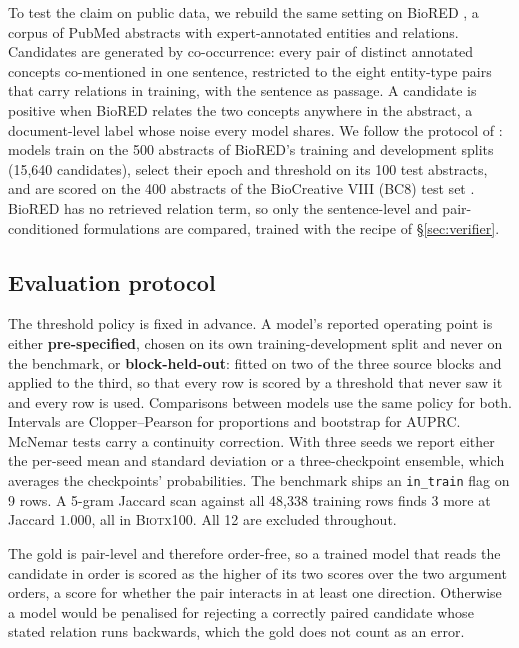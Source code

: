 \documentclass[11pt]{article}
\begin{document}
To test the claim on public data, we rebuild the same setting on BioRED \citep{luo2022biored}, a
corpus of PubMed abstracts with expert-annotated entities and relations. Candidates are generated
by co-occurrence: every pair of distinct annotated concepts co-mentioned in one sentence, restricted
to the eight entity-type pairs that carry relations in training, with the sentence as passage. A candidate is positive when BioRED relates
the two concepts anywhere in the abstract, a document-level label whose noise every model shares.
We follow the protocol of \citet{lai2025bioredirect}: models train on the 500 abstracts of BioRED's
training and development splits (15{,}640 candidates), select their epoch and threshold on its 100
test abstracts, and are scored on the 400 abstracts of the BioCreative VIII (BC8) test set
\citep{islamaj2024overview}. BioRED has no retrieved relation term, so only the sentence-level and
pair-conditioned formulations are compared, trained with the recipe of \S\ref{sec:verifier}.

\subsection{Evaluation protocol}
\label{sec:protocol}

The threshold policy is fixed in advance. A model's reported operating point is either
\textbf{pre-specified}, chosen on its own training-development split and never on the benchmark, or
\textbf{block-held-out}: fitted on two of the three source blocks and applied to the third, so that
every row is scored by a threshold that never saw it and every row is used. Comparisons between
models use the same policy for both. Intervals are Clopper--Pearson for proportions and bootstrap for AUPRC. McNemar tests
\citep{mcnemar1947note} carry a continuity correction. With three seeds we report either the
per-seed mean and standard deviation or a three-checkpoint ensemble, which averages the checkpoints'
probabilities. The benchmark ships an \texttt{in\_train} flag on 9 rows. A 5-gram Jaccard scan
against all 48{,}338 training rows finds 3 more at Jaccard $1.000$, all in \textsc{Biotx100}. All 12 are
excluded throughout.

The gold is pair-level and therefore order-free, so a trained model that reads the candidate in order is
scored as the higher of its two scores over the two argument orders, a score for whether the
pair interacts in at least one direction. Otherwise a model would be penalised for rejecting a
correctly paired candidate whose stated relation runs backwards, which the gold does not count as an
error.
\end{document}
